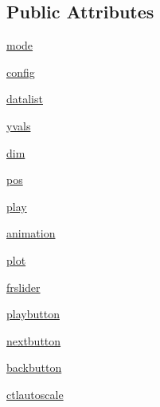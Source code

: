 \subsection*{Public Attributes}
\begin{DoxyCompactItemize}
\item 
\hyperlink{class_uni_dec_1_1unidec__modules_1_1_plot_animations_1_1_animation_window_a4fd85e6b55eccfb80deef19b19adf3e2}{mode}
\item 
\hyperlink{class_uni_dec_1_1unidec__modules_1_1_plot_animations_1_1_animation_window_a9c33738b4b41b40c5fa5aab0e1623cd7}{config}
\item 
\hyperlink{class_uni_dec_1_1unidec__modules_1_1_plot_animations_1_1_animation_window_ad9809b4e846b53fe0bbb9c485c27a0c1}{datalist}
\item 
\hyperlink{class_uni_dec_1_1unidec__modules_1_1_plot_animations_1_1_animation_window_af8995df5d3e0c816ddce976803d29206}{yvals}
\item 
\hyperlink{class_uni_dec_1_1unidec__modules_1_1_plot_animations_1_1_animation_window_ae191e0fced5848f647e13fe3a2ea701e}{dim}
\item 
\hyperlink{class_uni_dec_1_1unidec__modules_1_1_plot_animations_1_1_animation_window_a29f6a6c8ac99643984bad06eae2f47ae}{pos}
\item 
\hyperlink{class_uni_dec_1_1unidec__modules_1_1_plot_animations_1_1_animation_window_a188322b15ace96e2e395f72b7d7b31eb}{play}
\item 
\hyperlink{class_uni_dec_1_1unidec__modules_1_1_plot_animations_1_1_animation_window_a8945c7470be349dc9e4f7349f76fc4ed}{animation}
\item 
\hyperlink{class_uni_dec_1_1unidec__modules_1_1_plot_animations_1_1_animation_window_a0e13e933efdf449ab1bb4029f9c7d59f}{plot}
\item 
\hyperlink{class_uni_dec_1_1unidec__modules_1_1_plot_animations_1_1_animation_window_a7f9e82cf252ec79970aced32f988cdad}{frslider}
\item 
\hyperlink{class_uni_dec_1_1unidec__modules_1_1_plot_animations_1_1_animation_window_a8c36dc73a15c8bedc15f8da00b8c4c9c}{playbutton}
\item 
\hyperlink{class_uni_dec_1_1unidec__modules_1_1_plot_animations_1_1_animation_window_ab9746238cd6ae8aa4e9932c8f0df2279}{nextbutton}
\item 
\hyperlink{class_uni_dec_1_1unidec__modules_1_1_plot_animations_1_1_animation_window_adab1ddd1d2013941bc036f3ba44447e0}{backbutton}
\item 
\hyperlink{class_uni_dec_1_1unidec__modules_1_1_plot_animations_1_1_animation_window_ae15c19813ce873a72202225b05ee1f76}{ctlautoscale}
\end{DoxyCompactItemize}



